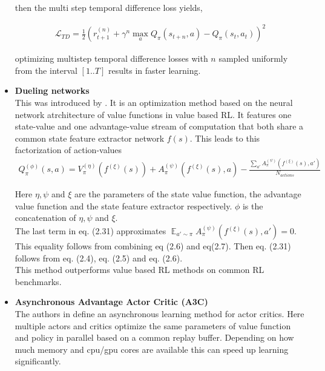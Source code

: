 \begin{itemize}
	then the multi step temporal difference loss yields,
	
	\begin{align}
		\mathcal{L}_{TD} = \frac{1}{2} \left(r_{t+1}^{(n)} + \gamma^{n} \max_{a}Q_{\pi}(s_{t+n}, a) - Q_{\pi}(s_t, a_t)\right)^2
	\end{align}
	
	optimizing multistep temporal difference losses with $n$ sampled uniformly from the interval $[1..T]$ results in faster learning.
	
	\item \textbf{Dueling networks}\\
	This was introduced by \cite{DBLP:journals/corr/WangFL15}. It is an optimization method based on the neural network atrchitecture of value functions in value based RL. It features one state-value and one advantage-value stream of computation that both share a common state feature extractor network $f(s)$. This leads to this factorization of action-values
	\begin{align}
		Q_{\pi}^{(\phi)}(s, a) = V_{\pi}^{(\eta)}(f^{(\xi)}(s)) + A_{\pi}^{(\psi)}(f^{(\xi)}(s), a) - \frac{\sum_{a'} A_{\pi}^{(\psi)}(f^{(\xi)}(s), a')}{N_{actions}}
	\end{align}
	
	Here $\eta, \psi$ and $\xi$ are the parameters of the state value function, the advantage value function and the state feature extractor respectively. $\phi$ is the concatenation of $\eta, \psi$ and $\xi$.\\
	The last term in eq. (2.31) approximates $\mathop{\mathbb{E}}_{a' \sim \pi} A_{\pi}^{(\psi)}(f^{(\xi)}(s), a')=0$. This equality follows from combining eq (2.6) and eq(2.7). Then eq. (2.31) follows from eq. (2.4), eq. (2.5) and eq. (2.6).\\
	This method outperforms value based RL methods on common RL benchmarks. 
	
	\item \textbf{Asynchronous Advantage Actor Critic (A3C)} \label{ssec::a3c}\\
	The authors in \cite{mnih2016asynchronous} define an asynchronous learning method for actor critics. Here multiple actors and critics optimize the same parameters of value function and policy in parallel based on a common replay buffer. Depending on how much memory and cpu/gpu cores are available this can speed up learning significantly.
	
\end{itemize}
